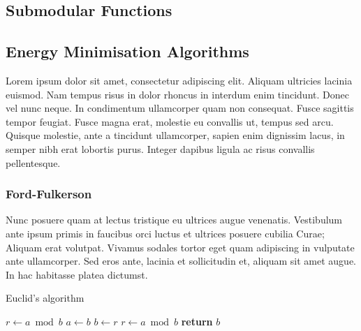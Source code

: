 \subsection{Submodular Functions}
\label{sec:Submodular Functions}


\subsection{Energy Minimisation Algorithms}
\label{sec:MaxFlowMinCutAlgoithms}

Lorem ipsum dolor sit amet, consectetur adipiscing elit. Aliquam ultricies lacinia euismod. Nam tempus risus in dolor rhoncus in interdum enim tincidunt. Donec vel nunc neque. In condimentum ullamcorper quam non consequat. Fusce sagittis tempor feugiat. Fusce magna erat, molestie eu convallis ut, tempus sed arcu. Quisque molestie, ante a tincidunt ullamcorper, sapien enim dignissim lacus, in semper nibh erat lobortis purus. Integer dapibus ligula ac risus convallis pellentesque.

\subsubsection{Ford-Fulkerson}

Nunc posuere quam at lectus tristique eu ultrices augue venenatis. Vestibulum ante ipsum primis in faucibus orci luctus et ultrices posuere cubilia Curae; Aliquam erat volutpat. Vivamus sodales tortor eget quam adipiscing in vulputate ante ullamcorper. Sed eros ante, lacinia et sollicitudin et, aliquam sit amet augue. In hac habitasse platea dictumst.

\begin{algorithm}
	\caption{Euclid’s algorithm}\label{alg:euclid}
	\begin{algorithmic}[1]
		\State $r\gets a\bmod b$
		\State $a\gets b$
		\State $b\gets r$
		\State $r\gets a\bmod b$
		\EndWhile\label{euclidendwhile}
		\State \textbf{return} $b$
		\EndProcedure
	\end{algorithmic}
\end{algorithm}

